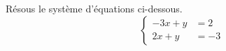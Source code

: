 %
%
    Résous le système d'équations ci-dessous.
              \[\left\{\begin{aligned}
                  -3x+y & = 2 \\
                  2x+y  & =-3
              \end{aligned}\right.\]

